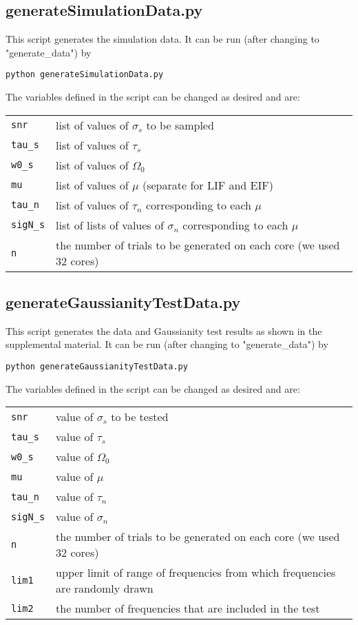 \documentclass{article}
\begin{document}
\subsection{generateSimulationData.py}
This script generates the simulation data. It can be run (after changing to "generate\_data") by
\begin{verbatim}
python generateSimulationData.py
\end{verbatim}
The variables defined in the script can be changed as desired and are:
\begin{table}[h]
\label{my-label}
\begin{tabular}{ll}
\verb!snr!    & list of values of $\sigma_s$ to be sampled \\
\verb!tau_s! & list of values of $\tau_s$                 \\
\verb!w0_s!  & list of values of $\Omega_0$               \\
\verb!mu!  & list of values of $\mu$ (separate for LIF and EIF)\\
\verb!tau_n!  & list of values of $\tau_n$ corresponding to each $\mu$\\
\verb!sigN_s!  & list of lists of values of $\sigma_n$ corresponding to each $\mu$\\
\verb!n!       & the number of trials to be generated on each core (we used 32 cores) \\
\end{tabular}
\end{table}

\subsection{generateGaussianityTestData.py}
This script generates the data and Gaussianity test results as shown in the supplemental material. It can be run (after changing to "generate\_data") by
\begin{verbatim}
python generateGaussianityTestData.py
\end{verbatim}
The variables defined in the script can be changed as desired and are:
\begin{table}[h]
\label{my-label}
\begin{tabular}{ll}
\verb!snr!    & value of $\sigma_s$ to be tested \\
\verb!tau_s! & value of $\tau_s$                 \\
\verb!w0_s!  & value of $\Omega_0$               \\
\verb!mu!  & value of $\mu$\\
\verb!tau_n!  & value of $\tau_n$\\
\verb!sigN_s!  & value of $\sigma_n$\\
  \verb!n!       & the number of trials to be generated on each core (we used 32 cores) \\
  \verb!lim1! & upper limit of range of frequencies from which frequencies are randomly drawn\\
\verb!lim2! & the number of frequencies that are included in the test

\end{tabular}
\end{table}
\end{document}
